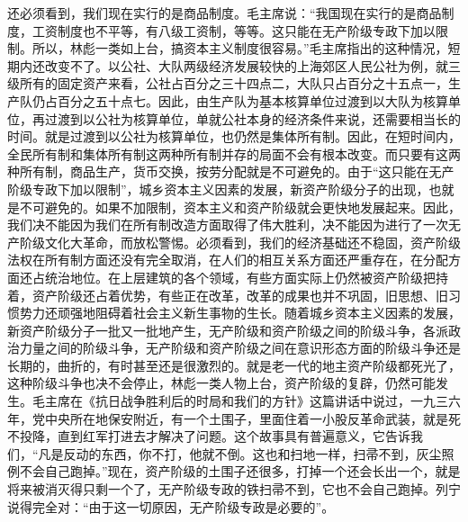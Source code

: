 \begin{maonote}
还必须看到，我们现在实行的是商品制度。毛主席说：“我国现在实行的是商品制度，工资制度也不平等，有八级工资制，等等。这只能在无产阶级专政下加以限制。所以，林彪一类如上台，搞资本主义制度很容易。”毛主席指出的这种情况，短期内还改变不了。以公社、大队两级经济发展较快的上海郊区人民公社为例，就三级所有的固定资产来看，公社占百分之三十四点二，大队只占百分之十五点一，生产队仍占百分之五十点七。因此，由生产队为基本核算单位过渡到以大队为核算单位，再过渡到以公社为核算单位，单就公社本身的经济条件来说，还需要相当长的时间。就是过渡到以公社为核算单位，也仍然是集体所有制。因此，在短时间内，全民所有制和集体所有制这两种所有制并存的局面不会有根本改变。而只要有这两种所有制，商品生产，货币交换，按劳分配就是不可避免的。由于“这只能在无产阶级专政下加以限制”，城乡资本主义因素的发展，新资产阶级分子的出现，也就是不可避免的。如果不加限制，资本主义和资产阶级就会更快地发展起来。因此，我们决不能因为我们在所有制改造方面取得了伟大胜利，决不能因为进行了一次无产阶级文化大革命，而放松警惕。必须看到，我们的经济基础还不稳固，资产阶级法权在所有制方面还没有完全取消，在人们的相互关系方面还严重存在，在分配方面还占统治地位。在上层建筑的各个领域，有些方面实际上仍然被资产阶级把持着，资产阶级还占着优势，有些正在改革，改革的成果也并不巩固，旧思想、旧习惯势力还顽强地阻碍着社会主义新生事物的生长。随着城乡资本主义因素的发展，新资产阶级分子一批又一批地产生，无产阶级和资产阶级之间的阶级斗争，各派政治力量之间的阶级斗争，无产阶级和资产阶级之间在意识形态方面的阶级斗争还是长期的，曲折的，有时甚至还是很激烈的。就是老一代的地主资产阶级都死光了，这种阶级斗争也决不会停止，林彪一类人物上台，资产阶级的复辟，仍然可能发生。毛主席在《抗日战争胜利后的时局和我们的方针》这篇讲话中说过，一九三六年，党中央所在地保安附近，有一个土围子，里面住着一小股反革命武装，就是死不投降，直到红军打进去才解决了问题。这个故事具有普遍意义，它告诉我们，“凡是反动的东西，你不打，他就不倒。这也和扫地一样，扫帚不到，灰尘照例不会自己跑掉。”现在，资产阶级的土围子还很多，打掉一个还会长出一个，就是将来被消灭得只剩一个了，无产阶级专政的铁扫帚不到，它也不会自己跑掉。列宁说得完全对：“由于这一切原因，无产阶级专政是必要的”。


\end{maonote}
